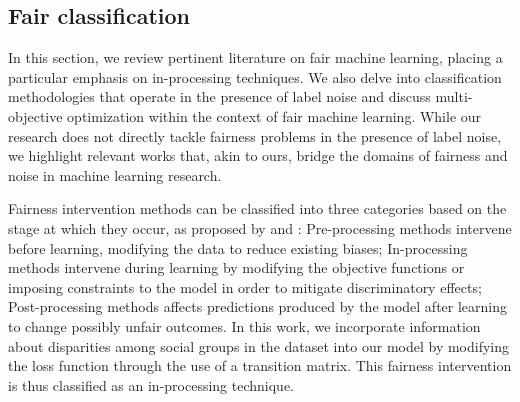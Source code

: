 


\subsection{Fair classification}

In this section, we review pertinent literature on fair machine learning, placing a particular emphasis on in-processing techniques. We also delve into classification methodologies that operate in the presence of label noise and discuss multi-objective optimization within the context of fair machine learning. While our research does not directly tackle fairness problems in the presence of label noise, we highlight relevant works that, akin to ours, bridge the domains of fairness and noise in machine learning research. 

Fairness intervention methods can be classified into three categories based on the stage at which they occur, as proposed by \cite{Mehrabi2019} and \cite{AlerTubella2022}: Pre-processing methods intervene before learning, modifying the data to reduce existing biases; In-processing methods intervene during learning by modifying the objective functions or imposing constraints to the model in order to mitigate discriminatory effects; Post-processing methods affects predictions produced by the model after learning to change possibly unfair outcomes. In this work, we incorporate information about disparities among social groups in the dataset into our model by modifying the loss function through the use of a transition matrix. This fairness intervention is thus classified as an in-processing technique.

